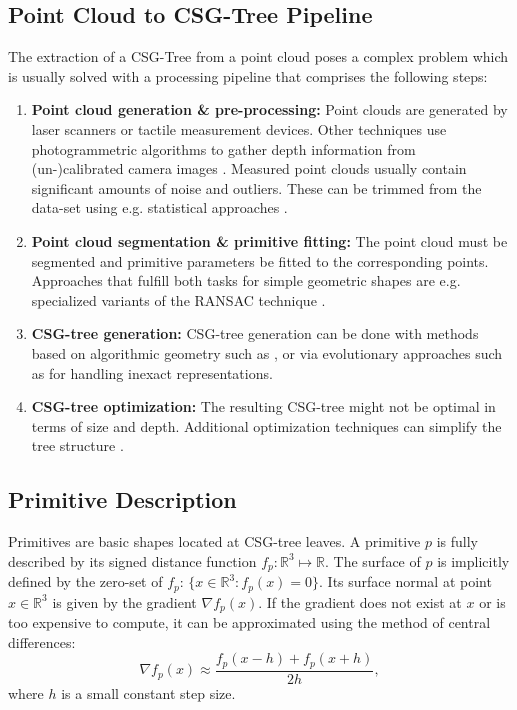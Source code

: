 \subsection{Point Cloud to \ac{CSG}-Tree Pipeline} 
The extraction of a \ac{CSG}-Tree from a point cloud poses a complex problem which is usually solved with a processing pipeline that comprises the following steps:  
\begin{enumerate}
 
\item \textbf{Point cloud generation \& pre-processing:} Point clouds are generated by laser scanners or tactile measurement devices. 
Other techniques use photogrammetric algorithms to gather depth information from (un-)calibrated camera images \cite{hartley2003multiple}.
Measured point clouds usually contain significant amounts of noise and outliers. 
These can be trimmed from the data-set using e.g. statistical approaches  \cite{rusu20113d}.
\item \textbf{Point cloud segmentation \& primitive fitting:} The point cloud must be segmented and primitive parameters be fitted to the corresponding points. Approaches that fulfill both tasks for simple geometric shapes are e.g. specialized variants of the \ac{RANSAC} technique \cite{schnabel2007efficient}.
\item \textbf{\ac{CSG}-tree generation:} \ac{CSG}-tree generation can be done with methods based on algorithmic geometry such as \cite{shapiro1993separation, buchele2004three}, or via evolutionary approaches such as \cite{fayolle2016evolutionary} for handling inexact representations.
\item \textbf {\ac{CSG}-tree optimization:} The resulting \ac{CSG}-tree might not be optimal in terms of size and depth.
Additional optimization techniques can simplify the tree structure \cite{weiss2009geometry, shapiro1991construction}. 
\end{enumerate}

\subsection{Primitive Description}
Primitives are basic shapes located at \ac{CSG}-tree leaves. 
A primitive $p$ is fully described by its 
signed distance function $f_p: \mathbb{R}^3 \mapsto \mathbb{R}$.
The surface of $p$ is implicitly defined by the zero-set of $f_p$: $\{x \in \mathbb{R}^3 : f_p(x)=0\}$.
Its surface normal at point $x \in \mathbb{R}^3$ is given by the gradient $\nabla f_p(x)$.
If the gradient does not exist at $x$ or is too expensive to compute, it can be approximated using the method of central differences:
\begin{equation}
\nabla f_p(x) \approx \frac{f_p(x - h) + f_p(x + h)}{2h},
\end{equation}
where $h$ is a small constant step size.

